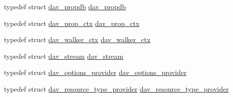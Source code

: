\begin{DoxyCompactItemize}
typedef struct \hyperlink{structdav__propdb}{dav\+\_\+propdb} \hyperlink{group__MOD__DAV_ga3950a19aee33c6595720afb0b42dfb46}{dav\+\_\+propdb}
\item 
typedef struct \hyperlink{structdav__prop__ctx}{dav\+\_\+prop\+\_\+ctx} \hyperlink{group__MOD__DAV_ga39282b6c6448d23b49791867f63aed77}{dav\+\_\+prop\+\_\+ctx}
\item 
typedef struct \hyperlink{structdav__walker__ctx}{dav\+\_\+walker\+\_\+ctx} \hyperlink{group__MOD__DAV_ga4019584d367580a1f462a4f38baeddfe}{dav\+\_\+walker\+\_\+ctx}
\item 
typedef struct \hyperlink{structdav__stream}{dav\+\_\+stream} \hyperlink{group__MOD__DAV_ga74927be963f6a960133c4f25e33efebf}{dav\+\_\+stream}
\item 
typedef struct \hyperlink{structdav__options__provider}{dav\+\_\+options\+\_\+provider} \hyperlink{group__MOD__DAV_ga3f9bbd119abc8278c7f006e4bb9d95be}{dav\+\_\+options\+\_\+provider}
\item 
typedef struct \hyperlink{structdav__resource__type__provider}{dav\+\_\+resource\+\_\+type\+\_\+provider} \hyperlink{group__MOD__DAV_ga51d12fbae5d67e214810ee44056ac114}{dav\+\_\+resource\+\_\+type\+\_\+provider}
\end{DoxyCompactItemize}
